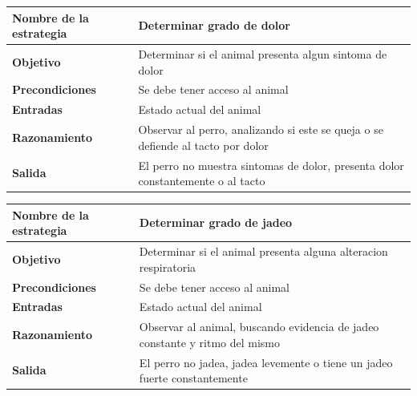 \documentclass[a4paper,table,xcdraw]{article}
\begin{document}
\begin{longtable}{|l|l|}
\hline
\textbf{Nombre de la estrategia} & Determinar grado de dolor                                                       \\ \hline
\endhead
%
\textbf{Objetivo}                & Determinar si el animal presenta algun sintoma de dolor                         \\ \hline
\textbf{Precondiciones}          & Se debe tener acceso al animal                                                  \\ \hline
\textbf{Entradas}                & Estado actual del animal                                                        \\ \hline
\textbf{Razonamiento}            & Observar al perro, analizando si este se queja o se defiende al tacto por dolor \\ \hline
\textbf{Salida}                  & El perro no muestra sintomas de dolor, presenta dolor constantemente o al tacto \\ \hline
\end{longtable}

\begin{longtable}{|l|l|}
\hline
\textbf{Nombre de la estrategia} & Determinar grado de jadeo                                                   \\ \hline
\endhead
%
\textbf{Objetivo}                & Determinar si el animal presenta alguna alteracion respiratoria             \\ \hline
\textbf{Precondiciones}          & Se debe tener acceso al animal                                              \\ \hline
\textbf{Entradas}                & Estado actual del animal                                                    \\ \hline
\textbf{Razonamiento}            & Observar al animal, buscando evidencia de jadeo constante y ritmo del mismo \\ \hline
\textbf{Salida}                  & El perro no jadea, jadea levemente o tiene un jadeo fuerte constantemente   \\ \hline
\end{longtable}
\end{document}
